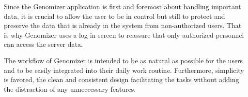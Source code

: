 Since the Genomizer application is first and foremost about handling important 
data, it is crucial to allow the user to be in control but still to protect 
and preserve the data that is already in the system from non-authorized users.
That is why Genomizer uses a log in screen to reassure that only authorized 
personnel can access the server data.

The workflow of Genomizer is intended to be as natural as possible for 
the users and to be easily integrated into their daily work routine.
Furthermore, simplicity is favored, the clean and consistent design 
facilitating the tasks without adding the distraction of any 
unneccessary features.

